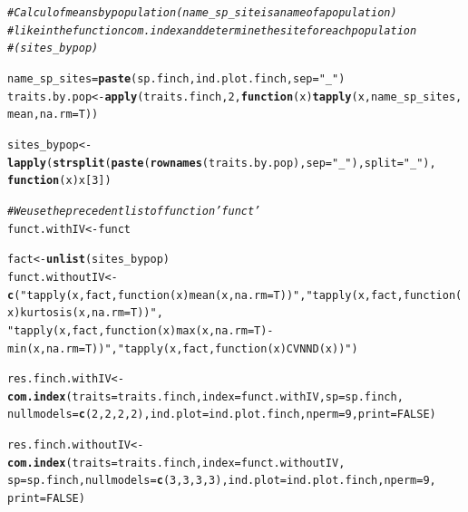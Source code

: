 \documentclass[12pt]{article}\usepackage[]{graphicx}\usepackage[]{color}
\makeatletter
\newcommand{\hlnum}[1]{\textcolor[rgb]{0.686,0.059,0.569}{#1}}%
\newcommand{\hlstr}[1]{\textcolor[rgb]{0.192,0.494,0.8}{#1}}%
\newcommand{\hlcom}[1]{\textcolor[rgb]{0.678,0.584,0.686}{\textit{#1}}}%
\newcommand{\hlstd}[1]{\textcolor[rgb]{0.345,0.345,0.345}{#1}}%
\newcommand{\hlkwa}[1]{\textcolor[rgb]{0.161,0.373,0.58}{\textbf{#1}}}%
\newcommand{\hlkwb}[1]{\textcolor[rgb]{0.69,0.353,0.396}{#1}}%
\newcommand{\hlkwc}[1]{\textcolor[rgb]{0.333,0.667,0.333}{#1}}%
\newcommand{\hlkwd}[1]{\textcolor[rgb]{0.737,0.353,0.396}{\textbf{#1}}}%
\newenvironment{kframe}{%
 \def\at@end@of@kframe{}%
 \ifinner\ifhmode%
  \def\at@end@of@kframe{\end{minipage}}%
  \begin{minipage}{\columnwidth}%
 \fi\fi%
 \def\FrameCommand##1{\hskip\@totalleftmargin \hskip-\fboxsep
 \colorbox{shadecolor}{##1}\hskip-\fboxsep
     \hskip-\linewidth \hskip-\@totalleftmargin \hskip\columnwidth}%
 \MakeFramed {\advance\hsize-\width
   \@totalleftmargin\z@ \linewidth\hsize
   \@setminipage}}%
 {\par\unskip\endMakeFramed%
 \at@end@of@kframe}
\newenvironment{knitrout}{}{} %
\makeatother
\begin{document}
\begin{knitrout}
\color{fgcolor}\begin{kframe}
\begin{alltt}
\hlcom{# Calcul of means by population (name_sp_site is a name of a population)}
\hlcom{# like in the function com.index and determine the site for each population}
\hlcom{# (sites_bypop)}

\hlstd{name_sp_sites} \hlkwb{=} \hlkwd{paste}\hlstd{(sp.finch, ind.plot.finch,} \hlkwc{sep} \hlstd{=} \hlstr{"_"}\hlstd{)}
\hlstd{traits.by.pop} \hlkwb{<-} \hlkwd{apply}\hlstd{(traits.finch,} \hlnum{2}\hlstd{,} \hlkwa{function}\hlstd{(}\hlkwc{x}\hlstd{)} \hlkwd{tapply}\hlstd{(x, name_sp_sites,}
    \hlstd{mean,} \hlkwc{na.rm} \hlstd{= T))}

\hlstd{sites_bypop} \hlkwb{<-} \hlkwd{lapply}\hlstd{(}\hlkwd{strsplit}\hlstd{(}\hlkwd{paste}\hlstd{(}\hlkwd{rownames}\hlstd{(traits.by.pop),} \hlkwc{sep} \hlstd{=} \hlstr{"_"}\hlstd{),} \hlkwc{split} \hlstd{=} \hlstr{"_"}\hlstd{),}
    \hlkwa{function}\hlstd{(}\hlkwc{x}\hlstd{) x[}\hlnum{3}\hlstd{])}

\hlcom{# We use the precedent list of function 'funct'}
\hlstd{funct.withIV} \hlkwb{<-} \hlstd{funct}

\hlstd{fact} \hlkwb{<-} \hlkwd{unlist}\hlstd{(sites_bypop)}
\hlstd{funct.withoutIV} \hlkwb{<-} \hlkwd{c}\hlstd{(}\hlstr{"tapply(x, fact, function(x) mean(x, na.rm=T))"}\hlstd{,} \hlstr{"tapply(x, fact, function(x) kurtosis(x, na.rm=T))"}\hlstd{,}
    \hlstr{"tapply(x, fact, function(x) max(x, na.rm=T)-min(x, na.rm=T))"}\hlstd{,} \hlstr{"tapply(x, fact, function(x) CVNND(x))"}\hlstd{)}


\hlstd{res.finch.withIV} \hlkwb{<-} \hlkwd{com.index}\hlstd{(}\hlkwc{traits} \hlstd{= traits.finch,} \hlkwc{index} \hlstd{= funct.withIV,} \hlkwc{sp} \hlstd{= sp.finch,}
    \hlkwc{nullmodels} \hlstd{=} \hlkwd{c}\hlstd{(}\hlnum{2}\hlstd{,} \hlnum{2}\hlstd{,} \hlnum{2}\hlstd{,} \hlnum{2}\hlstd{),} \hlkwc{ind.plot} \hlstd{= ind.plot.finch,} \hlkwc{nperm} \hlstd{=} \hlnum{9}\hlstd{,} \hlkwc{print} \hlstd{=} \hlnum{FALSE}\hlstd{)}

\hlstd{res.finch.withoutIV} \hlkwb{<-} \hlkwd{com.index}\hlstd{(}\hlkwc{traits} \hlstd{= traits.finch,} \hlkwc{index} \hlstd{= funct.withoutIV,}
    \hlkwc{sp} \hlstd{= sp.finch,} \hlkwc{nullmodels} \hlstd{=} \hlkwd{c}\hlstd{(}\hlnum{3}\hlstd{,} \hlnum{3}\hlstd{,} \hlnum{3}\hlstd{,} \hlnum{3}\hlstd{),} \hlkwc{ind.plot} \hlstd{= ind.plot.finch,} \hlkwc{nperm} \hlstd{=} \hlnum{9}\hlstd{,}
    \hlkwc{print} \hlstd{=} \hlnum{FALSE}\hlstd{)}
\end{alltt}
\end{kframe}
\end{knitrout}
\end{document}
